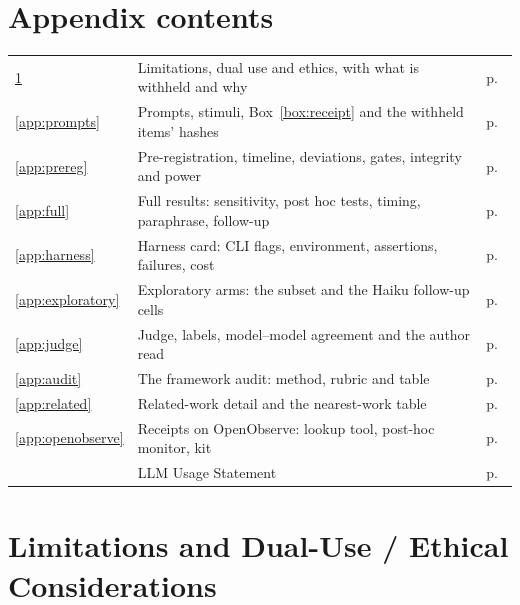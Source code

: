 \section*{Appendix contents}\label{app:contents}
\begin{tabular}{@{}l@{\quad}l@{\quad}r@{}}
\ref{app:limits} & Limitations, dual use and ethics, with what is withheld and why & p.~\pageref{app:limits} \\
\ref{app:prompts} & Prompts, stimuli, Box~\ref{box:receipt} and the withheld items' hashes & p.~\pageref{app:prompts} \\
\ref{app:prereg} & Pre-registration, timeline, deviations, gates, integrity and power & p.~\pageref{app:prereg} \\
\ref{app:full} & Full results: sensitivity, post hoc tests, timing, paraphrase, follow-up & p.~\pageref{app:full} \\
\ref{app:harness} & Harness card: CLI flags, environment, assertions, failures, cost & p.~\pageref{app:harness} \\
\ref{app:exploratory} & Exploratory arms: the \wtthDesignModelSonnetName{} subset and the Haiku follow-up cells & p.~\pageref{app:exploratory} \\
\ref{app:judge} & Judge, labels, model--model agreement and the author read & p.~\pageref{app:judge} \\
\ref{app:audit} & The framework audit: method, rubric and table & p.~\pageref{app:audit} \\
\ref{app:related} & Related-work detail and the nearest-work table & p.~\pageref{app:related} \\
\ref{app:openobserve} & Receipts on OpenObserve: lookup tool, post-hoc monitor, kit & p.~\pageref{app:openobserve} \\
 & LLM Usage Statement & p.~\pageref{app:llm} \\
\end{tabular}

\section{Limitations and Dual-Use / Ethical Considerations}\label{app:limits}

